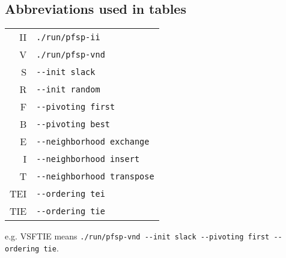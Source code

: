 \subsection{Abbreviations used in tables}

\begin{tabular}{rl}
II & \verb!./run/pfsp-ii!\\
V  & \verb!./run/pfsp-vnd!\\
S  & \verb!--init slack!\\
R  & \verb!--init random!\\
F  & \verb!--pivoting first!\\
B  & \verb!--pivoting best!\\
E  & \verb!--neighborhood exchange!\\
I  & \verb!--neighborhood insert!\\
T  & \verb!--neighborhood transpose!\\
TEI  & \verb!--ordering tei!\\
TIE  & \verb!--ordering tie!\\
\end{tabular}

e.g. VSFTIE means \verb!./run/pfsp-vnd --init slack --pivoting first --ordering tie!.